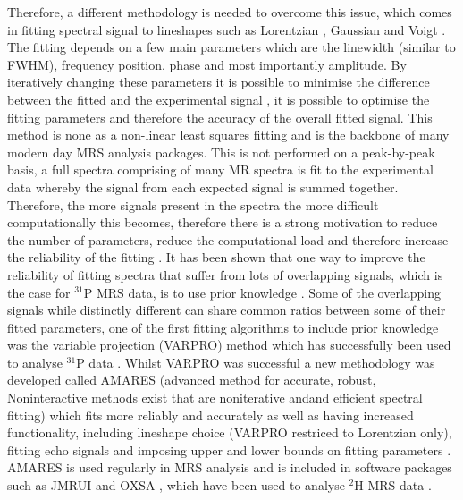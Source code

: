 \documentclass[class=article, crop=false]{standalone}
\begin{document}
Therefore, a different methodology is needed to overcome this issue, which comes in fitting spectral signal to lineshapes such as Lorentzian \cite{Lorentz1895TheHeat}, Gaussian and Voigt \cite{Near2021PreprocessingRecommendations}. The fitting depends on a few main parameters which are the linewidth (similar to FWHM), frequency position, phase and most importantly amplitude. By iteratively changing these parameters it is possible to minimise the difference between the fitted and the experimental signal \cite{Vanhamme2001MRMethods}, it is possible to optimise the fitting parameters and therefore the accuracy of the overall fitted signal. This method is none as a non-linear least squares \cite{Golub1973TheSeparate} fitting and is the backbone of many modern day MRS analysis packages. This is not performed on a peak-by-peak basis, a full spectra comprising of many MR spectra is fit to the experimental data whereby the signal from each expected signal is summed together. Therefore, the more signals present in the spectra the more difficult computationally this becomes, therefore there is a strong motivation to reduce the number of parameters, reduce the computational load and therefore increase the reliability of the fitting \cite{Near2021PreprocessingRecommendations}. It has been shown that one way to improve the reliability of fitting spectra that suffer from lots of overlapping signals, which is the case for $^{31}$P MRS data, is to use prior knowledge \cite{Hamilton2003PriorSpectra}. Some of the overlapping signals while distinctly different can share common ratios between some of their fitted parameters, one of the first fitting algorithms to include prior knowledge was the variable projection (VARPRO) method \cite{Golub1973TheSeparate} which has successfully been used to analyse $^{31}$P data \cite{vanderVeen1988AccurateKnowledge,Stubbs199631P-MagneticADP}. Whilst VARPRO was successful a new methodology was developed called AMARES (advanced method for accurate, robust, Noninteractive methods exist that are noniterative andand efficient spectral fitting) which fits more reliably and accurately as well as having increased functionality, including lineshape choice (VARPRO restriced to Lorentzian only), fitting echo signals and imposing upper and lower bounds on fitting parameters \cite{Vanhamme1997ImprovedKnowledge}. AMARES is used regularly in MRS analysis and is included in software packages such as JMRUI \cite{Stefan2009QuantitationPackage} and OXSA \cite{Purvis2017OXSA:MATLAB}, which have been used to analyse $^2$H MRS data \cite{Simoes2022GlucoseGlioblastoma,Kreis2020MeasuringMRI,Kaggie2022DeuteriumMetabolism}. 
\end{document}
